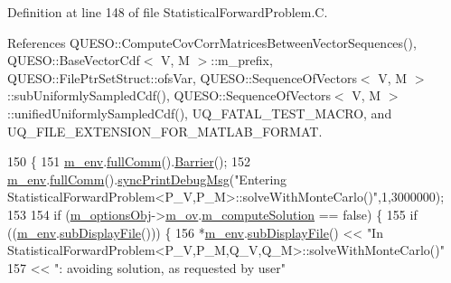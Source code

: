 Definition at line 148 of file Statistical\-Forward\-Problem.\-C.



References Q\-U\-E\-S\-O\-::\-Compute\-Cov\-Corr\-Matrices\-Between\-Vector\-Sequences(), Q\-U\-E\-S\-O\-::\-Base\-Vector\-Cdf$<$ V, M $>$\-::m\-\_\-prefix, Q\-U\-E\-S\-O\-::\-File\-Ptr\-Set\-Struct\-::ofs\-Var, Q\-U\-E\-S\-O\-::\-Sequence\-Of\-Vectors$<$ V, M $>$\-::sub\-Uniformly\-Sampled\-Cdf(), Q\-U\-E\-S\-O\-::\-Sequence\-Of\-Vectors$<$ V, M $>$\-::unified\-Uniformly\-Sampled\-Cdf(), U\-Q\-\_\-\-F\-A\-T\-A\-L\-\_\-\-T\-E\-S\-T\-\_\-\-M\-A\-C\-R\-O, and U\-Q\-\_\-\-F\-I\-L\-E\-\_\-\-E\-X\-T\-E\-N\-S\-I\-O\-N\-\_\-\-F\-O\-R\-\_\-\-M\-A\-T\-L\-A\-B\-\_\-\-F\-O\-R\-M\-A\-T.


\begin{DoxyCode}
150 \{
151   \hyperlink{class_q_u_e_s_o_1_1_statistical_forward_problem_ab8dc530366735e9ca11290e37f95996a}{m\_env}.\hyperlink{class_q_u_e_s_o_1_1_base_environment_a0b0779b41ff304058856e97e1d16b4d4}{fullComm}().\hyperlink{class_q_u_e_s_o_1_1_mpi_comm_a4059971c30e023b272fccaa6aa00c426}{Barrier}();
152   \hyperlink{class_q_u_e_s_o_1_1_statistical_forward_problem_ab8dc530366735e9ca11290e37f95996a}{m\_env}.\hyperlink{class_q_u_e_s_o_1_1_base_environment_a0b0779b41ff304058856e97e1d16b4d4}{fullComm}().\hyperlink{class_q_u_e_s_o_1_1_mpi_comm_a6f73891de4668c325277ddaa799cf808}{syncPrintDebugMsg}(\textcolor{stringliteral}{"Entering
       StatisticalForwardProblem<P\_V,P\_M>::solveWithMonteCarlo()"},1,3000000);
153 
154   \textcolor{keywordflow}{if} (\hyperlink{class_q_u_e_s_o_1_1_statistical_forward_problem_a4c286957fda7c134718422d9d4e4f1ca}{m\_optionsObj}->\hyperlink{class_q_u_e_s_o_1_1_statistical_forward_problem_options_a87ad4acd32801ea3edd5e65ffb093dbf}{m\_ov}.\hyperlink{class_q_u_e_s_o_1_1_sfp_options_values_a087c7e28e7c72ee99d5722f75e43c8bb}{m\_computeSolution} == \textcolor{keyword}{false}) \{
155     \textcolor{keywordflow}{if} ((\hyperlink{class_q_u_e_s_o_1_1_statistical_forward_problem_ab8dc530366735e9ca11290e37f95996a}{m\_env}.\hyperlink{class_q_u_e_s_o_1_1_base_environment_a8a0064746ae8dddfece4229b9ad374d6}{subDisplayFile}())) \{
156       *\hyperlink{class_q_u_e_s_o_1_1_statistical_forward_problem_ab8dc530366735e9ca11290e37f95996a}{m\_env}.\hyperlink{class_q_u_e_s_o_1_1_base_environment_a8a0064746ae8dddfece4229b9ad374d6}{subDisplayFile}() << \textcolor{stringliteral}{"In
       StatisticalForwardProblem<P\_V,P\_M,Q\_V,Q\_M>::solveWithMonteCarlo()"}
157                               << \textcolor{stringliteral}{": avoiding solution, as requested by user"}

\end{DoxyCode}
